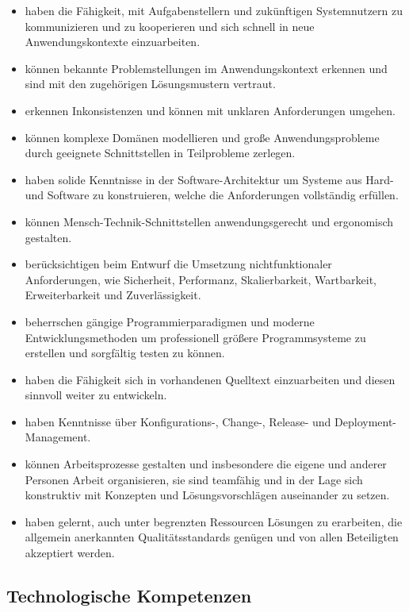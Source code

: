 \begin{itemize}
\tightlist
\item
  haben die Fähigkeit, mit Aufgabenstellern und zukünftigen
  Systemnutzern zu kommunizieren und zu kooperieren und sich schnell in
  neue Anwendungskontexte einzuarbeiten.
\item
  können bekannte Problemstellungen im Anwendungskontext erkennen und
  sind mit den zugehörigen Lösungsmustern vertraut.
\item
  erkennen Inkonsistenzen und können mit unklaren Anforderungen umgehen.
\item
  können komplexe Domänen modellieren und große Anwendungsprobleme durch
  geeignete Schnittstellen in Teilprobleme zerlegen.
\item
  haben solide Kenntnisse in der Software-Architektur um Systeme aus
  Hard- und Software zu konstruieren, welche die Anforderungen
  vollständig erfüllen.
\item
  können Mensch-Technik-Schnittstellen anwendungsgerecht und ergonomisch
  gestalten.
\item
  berücksichtigen beim Entwurf die Umsetzung nichtfunktionaler
  Anforderungen, wie Sicherheit, Performanz, Skalierbarkeit,
  Wartbarkeit, Erweiterbarkeit und Zuverlässigkeit.
\item
  beherrschen gängige Programmierparadigmen und moderne
  Entwicklungsmethoden um professionell größere Programmsysteme zu
  erstellen und sorgfältig testen zu können.
\item
  haben die Fähigkeit sich in vorhandenen Quelltext einzuarbeiten und
  diesen sinnvoll weiter zu entwickeln.
\item
  haben Kenntnisse über Konfigurations-, Change-, Release- und
  Deployment-Management.
\item
  können Arbeitsprozesse gestalten und insbesondere die eigene und
  anderer Personen Arbeit organisieren, sie sind teamfähig und in der
  Lage sich konstruktiv mit Konzepten und Lösungsvorschlägen auseinander
  zu setzen.
\item
  haben gelernt, auch unter begrenzten Ressourcen Lösungen zu
  erarbeiten, die allgemein anerkannten Qualitätsstandards genügen und
  von allen Beteiligten akzeptiert werden.
\end{itemize}

\subsection{Technologische
Kompetenzen\label{/mi-2017/selbstbericht/0200-qualifikationsziele/0000-qualifikationsziele}}\label{technologische-kompetenzenpathlabelmi-2017selbstbericht0200-qualifikationsziele0000-qualifikationsziele}

